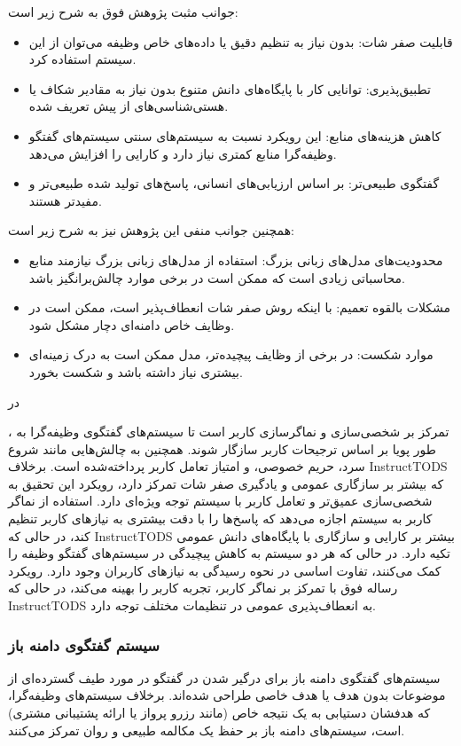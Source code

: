 جوانب مثبت پژوهش فوق به شرح زیر است:
\begin{itemize}
\item
قابلیت صفر شات: بدون نیاز به تنظیم دقیق یا داده‌های خاص وظیفه می‌توان از این سیستم استفاده کرد.
\item
تطبیق‌پذیری: توانایی کار با پایگاه‌های دانش متنوع بدون نیاز به مقادیر شکاف یا هستی‌شناسی‌های از پیش تعریف شده.
\item
کاهش هزینه‌های منابع: این رویکرد نسبت به سیستم‌های سنتی سیستم‌های گفتگو وظیفه‌گرا منابع کمتری نیاز دارد و کارایی را افزایش می‌دهد.
\item
گفتگوی طبیعی‌تر: بر اساس ارزیابی‌های انسانی، پاسخ‌های تولید شده طبیعی‌تر و مفیدتر هستند.
\end{itemize}

همچنین جوانب منفی این پژوهش نیز به شرح زیر است:
\begin{itemize}
\item
محدودیت‌های مدل‌های زبانی بزرگ: استفاده از مدل‌های زبانی بزرگ نیازمند منابع محاسباتی زیادی است که ممکن است در برخی موارد چالش‌برانگیز باشد.
\item
مشکلات بالقوه تعمیم: با اینکه روش صفر شات انعطاف‌پذیر است، ممکن است در وظایف خاص دامنه‌ای دچار مشکل شود.
\item
موارد شکست: در برخی از وظایف پیچیده‌تر، مدل ممکن است به درک زمینه‌ای بیشتری نیاز داشته باشد و شکست بخورد.
\end{itemize}

در %
\cite{madotto2021few}

، تمرکز بر شخصی‌سازی و نماگر‌سازی کاربر است تا سیستم‌های گفتگوی وظیفه‌گرا به طور پویا بر اساس ترجیحات کاربر سازگار شوند. همچنین به چالش‌هایی مانند شروع سرد، حریم خصوصی، و امتیاز تعامل کاربر پرداخته‌‌شده است. برخلاف InstructTODS که بیشتر بر سازگاری عمومی و یادگیری صفر شات تمرکز دارد، رویکرد این تحقیق به شخصی‌سازی عمیق‌تر و تعامل کاربر با سیستم توجه ویژه‌ای دارد. استفاده از نماگر کاربر به سیستم اجازه می‌دهد که پاسخ‌ها را با دقت بیشتری به نیازهای کاربر تنظیم کند، در حالی که InstructTODS بیشتر بر کارایی و سازگاری با پایگاه‌های دانش عمومی تکیه دارد. در حالی که هر دو سیستم به کاهش پیچیدگی در سیستم‌های گفتگو وظیفه را کمک می‌کنند، تفاوت اساسی در نحوه رسیدگی به نیازهای کاربران وجود دارد. رویکرد رساله فوق با تمرکز بر نماگر کاربر، تجربه کاربر را بهینه می‌کند، در حالی که InstructTODS به انعطاف‌پذیری عمومی در تنظیمات مختلف توجه دارد.

\subsubsection{سیستم گفتگوی دامنه باز}
سیستم‌های گفتگوی دامنه باز برای درگیر شدن در گفتگو در مورد طیف گسترده‌ای از موضوعات بدون هدف یا هدف خاصی طراحی شده‌اند. برخلاف سیستم‌های وظیفه‌گرا، که هدفشان دستیابی به یک نتیجه خاص (مانند رزرو پرواز یا ارائه پشتیبانی مشتری) است، سیستم‌های دامنه باز بر حفظ یک مکالمه طبیعی و روان تمرکز می‌کنند.


